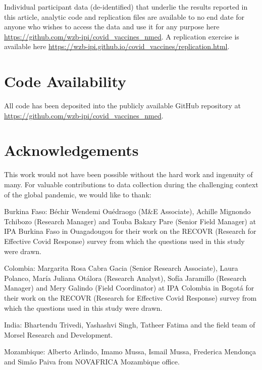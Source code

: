 \documentclass[
  12pt,
]{article}
\begin{document}
Individual participant data (de-identified) that underlie the results reported in this article, analytic code and replication files are available to no end date for anyone who wishes to access the data and use it for any purpose here \url{https://github.com/wzb-ipi/covid_vaccines_nmed}. A replication exercise is available here \url{https://wzb-ipi.github.io/covid_vaccines/replication.html}.

\hypertarget{code-availability}{%
\section*{Code Availability}\label{code-availability}}

All code has been deposited into the publicly available GitHub repository at \url{https://github.com/wzb-ipi/covid_vaccines_nmed}.

\hypertarget{acknowledgements}{%
\section*{Acknowledgements}\label{acknowledgements}}

This work would not have been possible without the hard work and ingenuity of many. For valuable contributions to data collection during the challenging context of the global pandemic, we would like to thank:

Burkina Faso: Béchir Wendemi Ouédraogo (M\&E Associate), Achille Mignondo Tchibozo (Research Manager) and Touba Bakary Pare (Senior Field Manager) at IPA Burkina Faso in Ouagadougou for their work on the RECOVR (Research for Effective Covid Response) survey from which the questions used in this study were drawn.

Colombia: Margarita Rosa Cabra Gacia (Senior Research Associate), Laura Polanco, María Juliana Otálora (Research Analyst), Sofía Jaramillo (Research Manager) and Mery Galindo (Field Coordinator) at IPA Colombia in Bogotá for their work on the RECOVR (Research for Effective Covid Response) survey from which the questions used in this study were drawn.

India: Bhartendu Trivedi, Yashashvi Singh, Tatheer Fatima and the field team of Morsel Research and Development.

Mozambique: Alberto Arlindo, Imamo Mussa, Ismail Mussa, Frederica Mendonça and Simão Paiva from NOVAFRICA Mozambique office.
\end{document}
